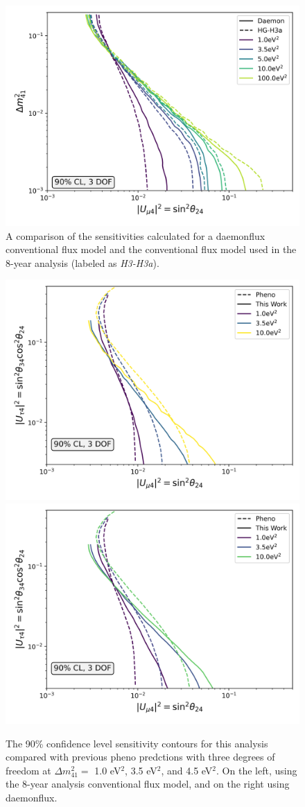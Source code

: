 \documentclass[main.tex]{subfiles}
\begin{document}
\begin{figure}
    \centering
    \includegraphics[width=0.7\linewidth]{figures/double_joint_full_daemon_Realization_daemon_Asimov_sterile_0_cl0.9_dof3.png}
    \caption{A comparison of the sensitivities calculated for a daemonflux conventional flux model and the conventional flux model used in the 8-year analysis (labeled as \textit{H3-H3a}).}\label{fig:asimov_model_compare}
\end{figure}


\begin{figure}
    \centering
    \includegraphics[width=0.45\linewidth]{figures/pheno_joint_asimov_oldairs_Realization_Asimov_sterile_0_cl0.9_dof3.png}%
    \includegraphics[width=0.45\linewidth]{figures/pheno_joint_daemon_update_Realization_daemon_Asimov_sterile_0_cl0.9_dof3.png}
    \caption{The 90\% confidence level sensitivity contours for this analysis compared with previous pheno predctions with three degrees of freedom at $\Delta m_{41}^{2}=$ 1.0 eV$^{2}$, 3.5 eV$^{2}$, and  4.5 eV$^{2}$. On the left, using the 8-year analysis conventional flux model, and on the right using daemonflux.}\label{fig:pheno_compare}
\end{figure}
\end{document}
